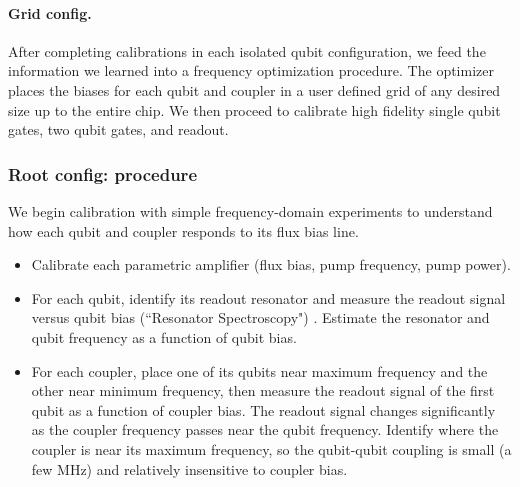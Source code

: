 \paragraph{Grid config.}
After completing calibrations in each isolated qubit configuration, we feed the information we learned into a frequency optimization procedure. The optimizer places the biases for each qubit and coupler in a user defined grid of any desired size up to the entire chip. We then proceed to calibrate high fidelity single qubit gates, two qubit gates, and readout.

\subsubsection{Root config: procedure}

We begin calibration with simple frequency-domain experiments to understand how each qubit and coupler responds to its flux bias line. 
\begin{itemize}
\item Calibrate each parametric amplifier (flux bias, pump frequency, pump power).
\item For each qubit, identify its readout resonator and measure the readout signal versus qubit bias (``Resonator Spectroscopy") \cite{Wallraff2004StrongCoupling}. Estimate the resonator and qubit frequency as a function of qubit bias.
\item For each coupler, place one of its qubits near maximum frequency and the other near minimum frequency, then measure the readout signal of the first qubit as a function of coupler bias. The readout signal changes significantly as the coupler frequency passes near the qubit frequency. Identify where the coupler is near its maximum frequency, so the qubit-qubit coupling is small (a few MHz) and relatively insensitive to coupler bias.
\end{itemize}

